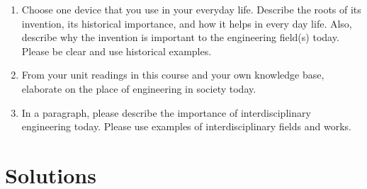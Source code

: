 \documentclass{article}
\begin{document}
\begin{enumerate}
\EEN
\item Choose one device that you use in your everyday life. Describe the roots of its invention, its historical importance, and how it helps in every day life. Also, describe why the invention is important to the engineering field(s) today. Please be clear and use historical examples.
\item From your unit readings in this course and your own knowledge base, elaborate on the place of engineering in society today.
\item In a paragraph, please describe the importance of interdisciplinary engineering today. Please use examples of interdisciplinary fields and works. 

\end{enumerate} %

\newpage
\section*{Solutions}
\end{document}
